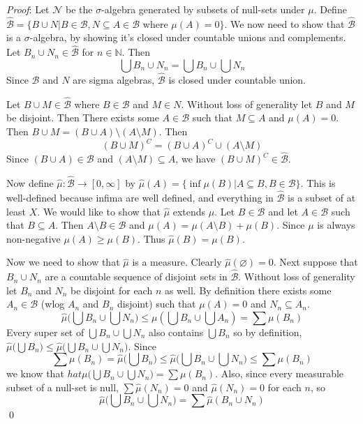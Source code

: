 \documentclass[12pt]{article}
\let\emptyset\varnothing
\renewenvironment{proof}{\hspace{-4 ex} \emph{Proof}:}{\qed}
\newcommand{\NN}{\mathbb{N}}
\begin{document}
	\begin{proof}
		Let $\mathcal{N}$ be the $\sigma$-algebra generated by subsets of null-sets under $\mu$. Define $\hat{\mathcal{B}} = \{B \cup N| B \in \mathcal{B}, N \subseteq A \in \mathcal{B}$ where $\mu(A)=0 \}$. We now need to show that $\hat{\mathcal{B}}$ is a $\sigma$-algebra, by showing it's closed under countable unions and complements. Let $B_n\cup N_n \in \hat{\mathcal{B}}$ for $n \in \NN$. Then
		$$
		\bigcup B_n\cup N_n = \bigcup B_n \cup \bigcup N_n
		$$
		Since $\mathcal{B}$ and $N$ are sigma algebras, $\hat{\mathcal{B}}$ is closed under countable union. \bigbreak
		
		Let $B \cup M \in \hat{\mathcal{B}}$ where $B \in \mathcal{B}$ and $M \in N$. Without loss of generality let $B$ and $M$ be disjoint. Then There exists some $A \in \mathcal{B}$ such that $M \subseteq A$ and $\mu(A) = 0$. Then $B \cup M = (B \cup A) \setminus (A \setminus M)$. Then
		$$
		(B \cup M)^C = (B \cup A)^C \cup (A \setminus M)
		$$
		Since $(B \cup A) \in \mathcal{B}$ and $(A \setminus M) \subseteq A$, we have $(B \cup M)^C \in \hat{\mathcal{B}}$. \bigbreak
		
		Now define $\hat{\mu}: \hat{\mathcal{B}} \to [0,\infty]$ by $\hat{\mu}(A) = \{\inf \mu(B) | A \subseteq B, B \in \mathcal{B}\}$. This is well-defined because infima are well defined, and everything in $\hat{\mathcal{B}}$ is a subset of at least $X$. We would like to show that $\hat{\mu}$ extends $\mu$. Let $B \in \mathcal{B}$ and let $A \in \mathcal{B}$ such that $B \subseteq A$. Then $A \setminus B \in \mathcal{B}$ and $\mu(A) = \mu(A \setminus B) + \mu(B)$. Since $\mu$ is always non-negative $\mu(A) \geq \mu(B)$. Thus $\hat{\mu}(B) = \mu(B)$.
		
		Now we need to show that $\hat{\mu}$ is a measure. Clearly $\hat{\mu}(\emptyset) = 0$. Next suppose that $B_n \cup N_n$ are a countable sequence of disjoint sets in $\hat{\mathcal{B}}$. Without loss of generality let $B_n$ and $N_n$ be disjoint for each $n$ as well. By definition there exists some $A_n \in \mathcal{B}$ (wlog $A_n$ and $B_n$ disjoint) such that $\mu(A) = 0$ and $N_n \subseteq A_n$.
		$$
		\hat{\mu} \Big( \bigcup B_n \cup \bigcup N_n \Big) \leq \mu(\bigcup B_n \cup \bigcup A_n) = \sum \mu(B_n)
		$$
		Every super set of $\bigcup B_n \cup \bigcup N_n$ also contains $\bigcup B_n$ so by definition, $\hat{\mu} \Big( \bigcup B_n) \leq \hat{\mu} \Big( \bigcup B_n \cup \bigcup N_n \Big)$. Since 
		$$
		\sum \mu(B_n) = \hat{\mu} \Big( \bigcup B_n) \leq \hat{\mu} \Big( \bigcup B_n \cup \bigcup N_n \Big) \leq \sum \mu(B_n)
		$$
		we know that $hat{\mu} \Big( \bigcup B_n \cup \bigcup N_n \Big) = \sum \mu(B_n)$. Also, since every measurable subset of a null-set is null, $\sum \hat{\mu}(N_n) = 0$ and $\hat{\mu}(N_n)=0$ for each $n$, so
		$$
		\hat{\mu} \Big( \bigcup B_n \cup \bigcup N_n \Big) = \sum \hat{\mu}(B_n \cup N_n)
		$$
	\end{proof}
\end{document}
